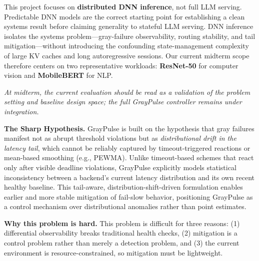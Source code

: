 \documentclass[12pt,conference]{IEEEtran}
\begin{document}
This project focuses on \textbf{distributed DNN inference}, not full LLM serving. Predictable DNN models are the correct starting point for establishing a clean systems result before claiming generality to stateful LLM serving. DNN inference isolates the systems problem---gray-failure observability, routing stability, and tail mitigation---without introducing the confounding state-management complexity of large KV caches and long autoregressive sessions. Our current midterm scope therefore centers on two representative workloads: \textbf{ResNet-50} for computer vision and \textbf{MobileBERT} for NLP.

\noindent\textit{At midterm, the current evaluation should be read as a validation of the problem setting and baseline design space; the full GrayPulse controller remains under integration.}

\noindent\textbf{The Sharp Hypothesis.}
GrayPulse is built on the hypothesis that gray failures manifest not as abrupt threshold violations but as \emph{distributional drift in the latency tail}, which cannot be reliably captured by timeout-triggered reactions or mean-based smoothing (e.g., PEWMA). Unlike timeout-based schemes that react only after visible deadline violations, GrayPulse explicitly models statistical inconsistency between a backend's current latency distribution and its own recent healthy baseline. This tail-aware, distribution-shift-driven formulation enables earlier and more stable mitigation of fail-slow behavior, positioning GrayPulse as a control mechanism over distributional anomalies rather than point estimates.

\noindent\textbf{Why this problem is hard.}
This problem is difficult for three reasons: (1) differential observability breaks traditional health checks, (2) mitigation is a control problem rather than merely a detection problem, and (3) the current environment is resource-constrained, so mitigation must be lightweight.

\begin{table}[t]
\centering
\footnotesize
\caption{Design-space comparison. GrayPulse occupies a distinct point in the design spectrum by exclusively targeting distributional shifts.}
\label{tab:designspace}
\end{table}
\end{document}
